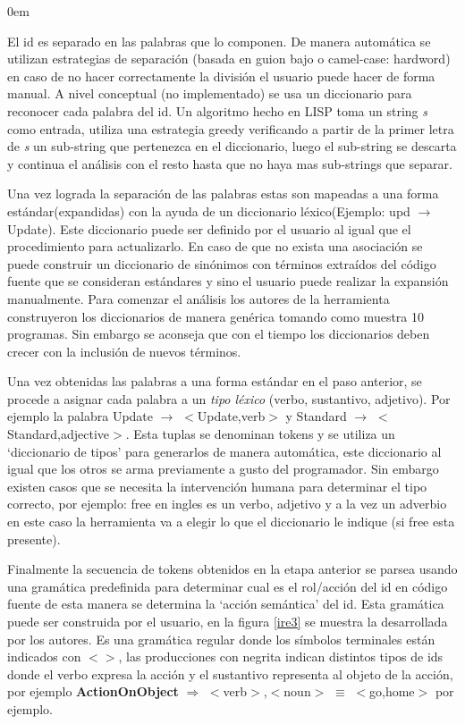 \documentclass[12pt]{report}
\begin{document}
\begin{description}
\itemsep0em%
\item[Segmentation:] El id es separado en las palabras que lo componen. De manera automática se utilizan estrategias de separación (basada en guion bajo o camel-case: hardword) en caso de no hacer correctamente la división el usuario puede hacer de forma manual. A nivel conceptual (no implementado) se usa un diccionario para reconocer cada palabra del id. Un algoritmo hecho en LISP toma un string \textit{s} como entrada, utiliza una estrategia greedy verificando a partir de la primer letra de \textit{s} un sub-string que pertenezca en el diccionario, luego el sub-string se descarta y continua el análisis con el resto hasta que no haya mas sub-strings que separar\cite{BCPT99}.

\item[Standard Lexicon:] Una vez lograda la separación de las palabras estas son mapeadas a una forma estándar(expandidas) con la ayuda de un diccionario léxico\cite{BCPT99}(Ejemplo: \textsf{upd} $\rightarrow$ \textsf{Update}). Este diccionario puede ser definido por el usuario al igual que el procedimiento para actualizarlo. En caso de que no exista una asociación se puede construir un diccionario de sinónimos con términos extraídos del código fuente que se consideran estándares y sino el usuario puede realizar la expansión manualmente. Para comenzar el análisis los autores\cite{BCPT00} de la herramienta construyeron los diccionarios de manera genérica tomando como muestra 10 programas. Sin embargo se aconseja que con el tiempo los diccionarios deben crecer con la inclusión de nuevos términos.

\item[Tokenization:] Una vez obtenidas las palabras a una forma estándar en el paso anterior, se procede a asignar cada palabra a un \textit{tipo léxico} (verbo, sustantivo, adjetivo). Por ejemplo la palabra Update $\rightarrow$ $<$Update,verb$>$ y Standard $\rightarrow$ $<$Standard,adjective$>$. Esta tuplas se denominan tokens y se utiliza un `diccionario de tipos' para generarlos de manera automática, este diccionario al igual que los otros se arma previamente a gusto del programador\cite{BCPT99}. Sin embargo existen casos que se necesita la intervención humana para determinar el tipo correcto, por ejemplo: free en ingles es un verbo, adjetivo y a la vez un adverbio en este caso la herramienta va a elegir lo que el diccionario le indique (si free esta presente).

\item[Parsing:] Finalmente la secuencia de tokens obtenidos en la etapa anterior se parsea usando una gramática predefinida para determinar cual es el rol/acción del id en código fuente de esta manera se determina la `acción semántica' del id. Esta gramática puede ser construida por el usuario, en la figura \ref{ire3} se muestra la desarrollada por los autores. Es una gramática regular donde los símbolos terminales están indicados con $<>$, las producciones con negrita indican distintos tipos de ids donde el verbo expresa la acción y el sustantivo representa al objeto de la acción, por ejemplo \textbf{ActionOnObject} $\Rightarrow$ $<$verb$>$,$<$noun$>$ $\equiv$ $<$go,home$>$ por ejemplo.


\end{description}
\end{document}

